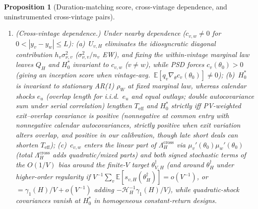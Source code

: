 \documentclass[12pt]{article}
\newtheorem{proposition}{Proposition}
\begin{document}
\begin{proposition}[Duration-matching score, cross-vintage dependence, and uninstrumented cross-vintage pairs]
\begin{enumerate}
  \item[\textbf{(ii)}] \emph{(Cross-vintage dependence.)}
  Under nearby dependence ($c_{v,w} \neq 0$ for $0 < |y_v - y_w| \le L$):
  (a)~$U_{v,H}$ eliminates the idiosyncratic diagonal contribution $h_v\sigma_{\nu,v}^2$ ($\sigma_{\nu,v}^2/n_v$ EW), and fixing the within-vintage marginal law leaves $Q_H$ and $H_0^\ast$ invariant to $c_{v,w}$ ($v \neq w$), while PSD forces $c_v(\theta_0) > 0$ (giving an inception score when vintage-avg.\ $\mathbb{E}[q_v\nabla_\theta c_v(\theta_0)] \neq 0$);
  (b)~$H_0^\ast$ is invariant to stationary AR(1) $\rho_W$ at fixed marginal law, whereas calendar shocks $e_u$ (overlap length for i.i.d.\ $e_u$ and equal outlays; double autocovariance sum under serial correlation) lengthen $T_{\mathrm{eff}}$ and $H_0^\ast$ strictly iff PV-weighted exit--overlap covariance is positive (nonnegative at common entry with nonnegative calendar autocovariances, strictly positive when exit variation alters overlap, and positive in our calibration, though late short deals can shorten $T_{\mathrm{eff}}$);
  (c)~$c_{v,w}$ enters the linear part of $\Lambda_H^{\mathrm{cross}}$ via $\mu_v'(\theta_0)\mu_w'(\theta_0)$ (total $\Lambda_H^{\mathrm{cross}}$ adds quadratic/mixed parts) and both signed stochastic terms of the $O(1/V)$ bias around the finite-$V$ target $\theta_{V,H}^\dagger$ (and around $\theta_H^\dagger$ under higher-order regularity if $V^{-1}\sum_v\mathbb{E}[s_{v,H}(\theta_H^\dagger)] = o(V^{-1})$, or $= \gamma_1(H)/V + o(V^{-1})$ adding $-\mathcal{H}_H^{-1}\gamma_1(H)/V$), while quadratic-shock covariances vanish at $H_0^\ast$ in homogeneous constant-return designs.


\end{enumerate}
\end{proposition}
\end{document}
